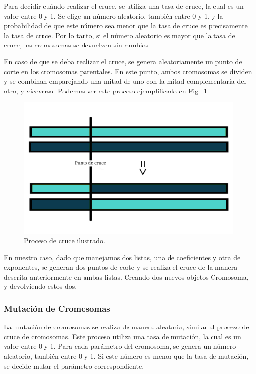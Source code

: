 \documentclass[conference,a4paper]{IEEEtran}
\def\figurename{Fig.}
\begin{document}
Para decidir cuándo realizar el cruce, se utiliza una tasa de cruce, la cual es un valor entre 0 y 1. Se elige un número aleatorio, también entre 0 y 1, y la probabilidad de que este número sea menor que la tasa de cruce es precisamente la tasa de cruce. Por lo tanto, si el número aleatorio es mayor que la tasa de cruce, los cromosomas se devuelven sin cambios. 

En caso de que se deba realizar el cruce, se genera aleatoriamente un punto de corte en los cromosomas parentales. En este punto, ambos cromosomas se dividen y se combinan emparejando una mitad de uno con la mitad complementaria del otro, y viceversa. Podemos ver este proceso ejemplificado en \figurename~\ref{fig:chromosome-crossover}


\begin{figure}[h]
    \centering
    \includegraphics[width=\columnwidth]{image-chromosome-crossover.jpg}
    \caption{Proceso de cruce ilustrado.}
    \label{fig:chromosome-crossover}
\end{figure}


En nuestro caso, dado que manejamos dos listas, una de coeficientes y otra de exponentes, se generan dos puntos de corte y se realiza el cruce de la manera descrita anteriormente en ambas listas. Creando dos nuevos objetos Cromosoma, y devolviendo estos dos.



\subsubsection{Mutación de Cromosomas}
La mutación de cromosomas se realiza de manera aleatoria, similar al proceso de cruce de cromosomas. Este proceso utiliza una tasa de mutación, la cual es un valor entre 0 y 1. Para cada parámetro del cromosoma, se genera un número aleatorio, también entre 0 y 1. Si este número es menor que la tasa de mutación, se decide mutar el parámetro correspondiente.
\end{document}
